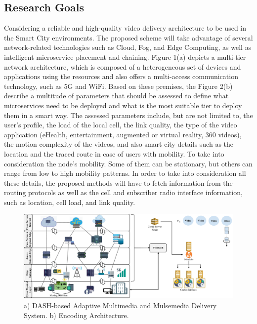 
\subsection*{Research Goals}
\label{sec:research-goals}


Considering a reliable and high-quality video delivery architecture to be used in the Smart City environments. The proposed scheme will take advantage of several network-related technologies such as Cloud, Fog, and Edge Computing, as well as intelligent microservice placement and chaining. Figure 1(a) depicts a multi-tier network architecture, which is composed of a heterogeneous set of devices and applications using the resources and also offers a multi-access communication technology, such as 5G and WiFi. Based on these premises, the Figure 2(b) describe a multitude of parameters that should be assessed to define what microservices need to be deployed and what is the most suitable tier to deploy them in a smart way.
The assessed parameters include, but are not limited to, the user’s profile, the load of the local cell, the link quality, the type of the video application (eHealth, entertainment, augmented or virtual reality, 360 videos), the motion complexity of the videos, and also smart city details such as the location and the traced route in case of users with mobility. To take into consideration the node’s mobility. Some of them can be stationary, but others can range from low to high mobility patterns. In order to take into consideration all these details, the proposed methods will have to fetch information from the routing protocols as well as the cell and subscriber radio interface information, such as location, cell load, and link quality.

\begin{figure}[htpb]
	\centering
	\includegraphics[width=1.0\textwidth]{images/scenario_incomplete}
	\caption{ a) DASH-based Adaptive Multimedia and Mulsemedia Delivery System. b) Encoding Architecture. }
	\label{fig:classes_E}
\end{figure}

